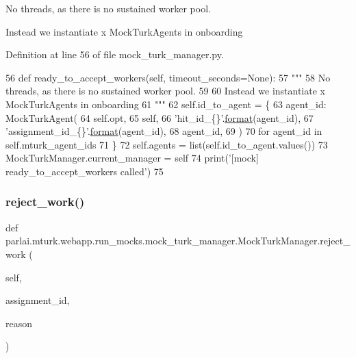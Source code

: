 \begin{DoxyVerb}No threads, as there is no sustained worker pool.

Instead we instantiate x MockTurkAgents in onboarding
\end{DoxyVerb}
 

Definition at line 56 of file mock\+\_\+turk\+\_\+manager.\+py.


\begin{DoxyCode}
56     \textcolor{keyword}{def }ready\_to\_accept\_workers(self, timeout\_seconds=None):
57         \textcolor{stringliteral}{"""}
58 \textcolor{stringliteral}{        No threads, as there is no sustained worker pool.}
59 \textcolor{stringliteral}{}
60 \textcolor{stringliteral}{        Instead we instantiate x MockTurkAgents in onboarding}
61 \textcolor{stringliteral}{        """}
62         self.id\_to\_agent = \{
63             agent\_id: MockTurkAgent(
64                 self.opt,
65                 self,
66                 \textcolor{stringliteral}{'hit\_id\_\{\}'}.\hyperlink{namespaceparlai_1_1chat__service_1_1services_1_1messenger_1_1shared__utils_a32e2e2022b824fbaf80c747160b52a76}{format}(agent\_id),
67                 \textcolor{stringliteral}{'assignment\_id\_\{\}'}.\hyperlink{namespaceparlai_1_1chat__service_1_1services_1_1messenger_1_1shared__utils_a32e2e2022b824fbaf80c747160b52a76}{format}(agent\_id),
68                 agent\_id,
69             )
70             \textcolor{keywordflow}{for} agent\_id \textcolor{keywordflow}{in} self.mturk\_agent\_ids
71         \}
72         self.agents = list(self.id\_to\_agent.values())
73         MockTurkManager.current\_manager = self
74         print(\textcolor{stringliteral}{'[mock] ready\_to\_accept\_workers called'})
75 
\end{DoxyCode}
\mbox{\label{classparlai_1_1mturk_1_1webapp_1_1run__mocks_1_1mock__turk__manager_1_1MockTurkManager_a7efb01e7ea15145cb2373b4c2552eeca}} 
\subsubsection{\texorpdfstring{reject\+\_\+work()}{reject\_work()}}
{\footnotesize\ttfamily def parlai.\+mturk.\+webapp.\+run\+\_\+mocks.\+mock\+\_\+turk\+\_\+manager.\+Mock\+Turk\+Manager.\+reject\+\_\+work (\begin{DoxyParamCaption}\item[{}]{self,  }\item[{}]{assignment\+\_\+id,  }\item[{}]{reason }\end{DoxyParamCaption})}



